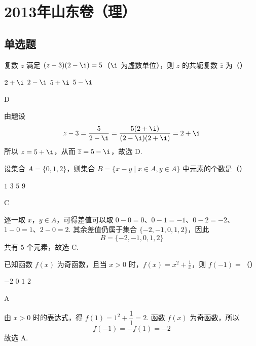 \chapter{2013年山东卷（理）}

\section{单选题}

\begin{problem}
复数 \(z\) 满足 \((z - 3)(2 - \i) = 5\)（\(\i\) 为虚数单位），则 \(z\) 的共轭复数 \(\overline{z}\) 为（\quad）

\choices
    {\(2 + \i\)}
    {\(2 - \i\)}
    {\(5 + \i\)}
    {\(5 - \i\)}
\end{problem}

\begin{answer}
D
\end{answer}

\begin{solution}
由题设
\[
z-3=\frac{5}{2-\i}=\frac{5(2+\i)}{(2-\i)(2+\i)}=2+\i
\]
所以 \(z=5+\i\)，从而 \(\overline{z}=5-\i\)，故选 D.
\end{solution}

\begin{problem}
设集合 \(A = \{0, 1, 2\}\)，则集合 \(B = \{x - y \mid x \in A, y \in A\}\) 中元素的个数是（\quad）

\choices
    {\(1\)}
    {\(3\)}
    {\(5\)}
    {\(9\)}
\end{problem}

\begin{answer}
C
\end{answer}

\begin{solution}
逐一取 \(x\)，\(y\in A\)，可得差值可以取 \(0-0=0\)、\(0-1=-1\)、\(0-2=-2\)、\(1-0=1\)、\(2-0=2\).
其余差值仍属于集合 \(\{-2,-1,0,1,2\}\)，因此
\[
B=\{-2,-1,0,1,2\}
\]
共有 \(5\) 个元素，故选 C.
\end{solution}

\begin{problem}
已知函数 \(f(x)\) 为奇函数，且当 \(x > 0\) 时，\(f(x) = x^2 + \frac{1}{x}\)，则 \(f(-1) =\)（\quad）

\choices
    {\(-2\)}
    {\(0\)}
    {\(1\)}
    {\(2\)}
\end{problem}

\begin{answer}
A
\end{answer}

\begin{solution}
由 \(x>0\) 时的表达式，得 \(f(1)=1^2+\dfrac{1}{1}=2\). 函数 \(f(x)\) 为奇函数，所以
\[
f(-1)=-f(1)=-2
\]
故选 A.
\end{solution}

